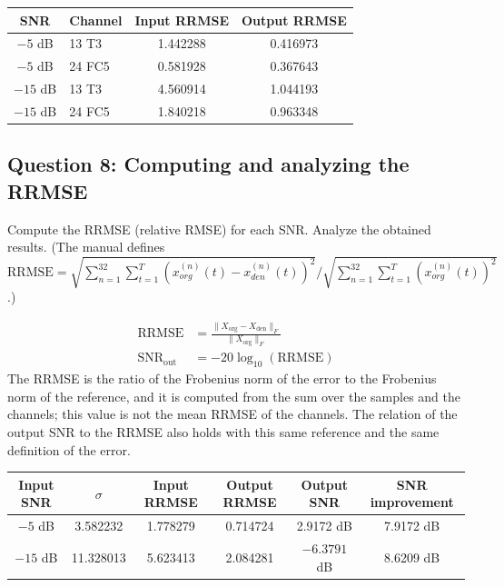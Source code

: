 \begin{center}
\begin{tabular}{@{}clcc@{}}
\toprule
\textbf{SNR} & \textbf{Channel} & \textbf{Input RRMSE} & \textbf{Output RRMSE}\\
\midrule
$-5$ dB  & 13 T3  & 1.442288 & 0.416973\\
$-5$ dB  & 24 FC5 & 0.581928 & 0.367643\\
$-15$ dB & 13 T3  & 4.560914 & 1.044193\\
$-15$ dB & 24 FC5 & 1.840218 & 0.963348\\
\bottomrule
\end{tabular}
\end{center}

\subsection*{Question 8: Computing and analyzing the RRMSE}
\begin{taskbox}
Compute the RRMSE (relative RMSE) for each SNR. Analyze the obtained results. (The manual defines $\mathrm{RRMSE}=\sqrt{\sum_{n=1}^{32}\sum_{t=1}^{T}(x_{org}^{(n)}(t)-x_{den}^{(n)}(t))^2}\big/\sqrt{\sum_{n=1}^{32}\sum_{t=1}^{T}(x_{org}^{(n)}(t))^2}$.)
\end{taskbox}

\begin{align}
\mathrm{RRMSE}&=\frac{\|X_{\mathrm{org}}-X_{\mathrm{den}}\|_F}{\|X_{\mathrm{org}}\|_F}\\
\mathrm{SNR}_{\mathrm{out}}&=-20\log_{10}(\mathrm{RRMSE})
\end{align}
The RRMSE is the ratio of the Frobenius norm of the error to the Frobenius norm of the reference, and it is computed from the sum over the samples and the channels; this value is not the mean RRMSE of the channels. The relation of the output SNR to the RRMSE also holds with this same reference and the same definition of the error.

\begin{center}
\small
\begin{tabular}{@{}cccccc@{}}
\toprule
\textbf{Input SNR} & $\sigma$ & \textbf{Input RRMSE} & \textbf{Output RRMSE} & \textbf{Output SNR} & \textbf{SNR improvement}\\
\midrule
$-5$ dB  &  3.582232 & 1.778279 & 0.714724 &  2.9172 dB & 7.9172 dB\\
$-15$ dB & 11.328013 & 5.623413 & 2.084281 & $-6.3791$ dB & 8.6209 dB\\
\bottomrule
\end{tabular}
\end{center}

